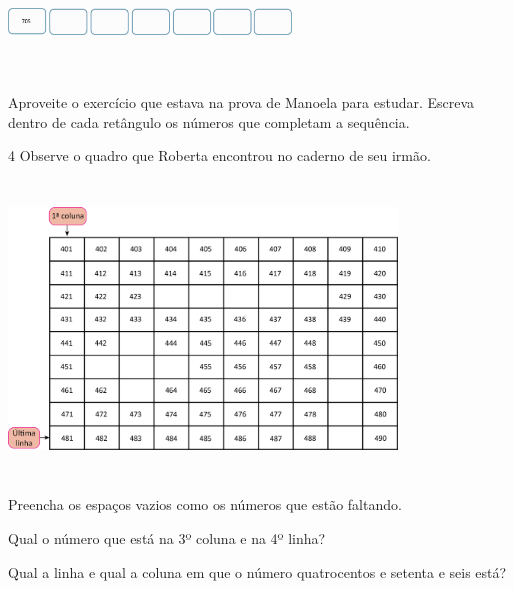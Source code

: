 \includegraphics[width=2.95859in,height=1.10010in]{media/image29.png}


Aproveite o exercício que estava na prova de Manoela para estudar.
Escreva dentro de cada retângulo os números que completam a sequência.


\num{4} Observe o quadro que Roberta encontrou no caderno de seu irmão.

\includegraphics[width=4.05869in,height=3.09193in]{media/image30.png}


\begin{escolha}
\item Preencha os espaços vazios como os números que estão faltando.


\item Qual o número que está na 3º coluna e na 4º linha?


\item Qual a linha e qual a coluna em que o número quatrocentos e setenta e seis está?

\end{escolha}

